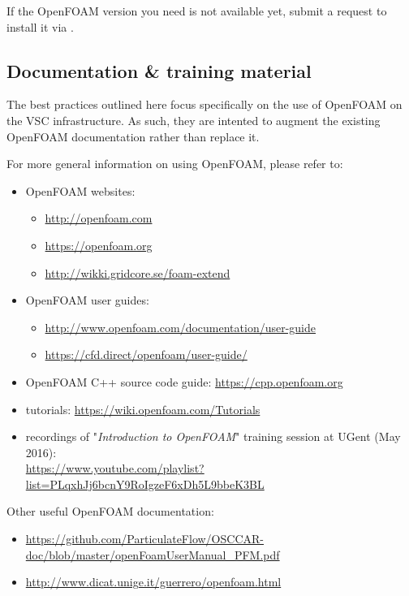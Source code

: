 If the OpenFOAM version you need is not available yet, submit a request to install it via \hpcinfo.


\subsection{Documentation \& training material}
\label{sec:best-practices-openfoam-documentation}

The best practices outlined here focus specifically on the use of OpenFOAM on the VSC \hpc infrastructure.
As such, they are intented to augment the existing OpenFOAM documentation rather than replace it.

For more general information on using OpenFOAM, please refer to:

\begin{itemize}
\item OpenFOAM websites:
\begin{itemize}
    \item \url{http://openfoam.com}
    \item \url{https://openfoam.org}
    \item \url{http://wikki.gridcore.se/foam-extend}
\end{itemize}
\item OpenFOAM user guides:
    \begin{itemize}
    \item \url{http://www.openfoam.com/documentation/user-guide}
    \item \url{https://cfd.direct/openfoam/user-guide/}
    \end{itemize}
\item OpenFOAM C++ source code guide: \url{https://cpp.openfoam.org}
\item tutorials: \url{https://wiki.openfoam.com/Tutorials}
\item recordings of "\textit{Introduction to OpenFOAM}" training session at UGent (May 2016):\\
      \small{\url{https://www.youtube.com/playlist?list=PLqxhJj6bcnY9RoIgzeF6xDh5L9bbeK3BL}}
\end{itemize}

Other useful OpenFOAM documentation:

\begin{itemize}
\item {\small\url{https://github.com/ParticulateFlow/OSCCAR-doc/blob/master/openFoamUserManual_PFM.pdf}}
\item \url{http://www.dicat.unige.it/guerrero/openfoam.html}
\end{itemize}

